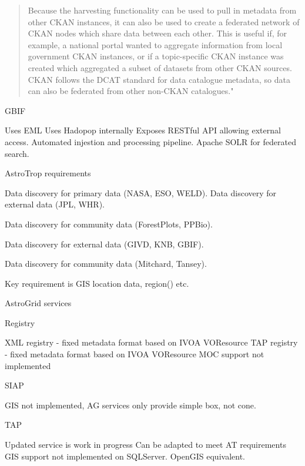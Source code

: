 \documentclass{article}
\begin{document}
\begin{quote}
Because the harvesting functionality can be used to pull in metadata from other CKAN instances,
it can also be used to create a federated network of CKAN nodes which share data between each other.
This is useful if, for example, a national portal wanted to aggregate information from local
government CKAN instances, or if a topic-specific CKAN instance was created which aggregated
a subset of datasets from other CKAN sources. CKAN follows the DCAT standard for data catalogue
metadata, so data can also be federated from other non-CKAN catalogues." 
\end{quote}



GBIF

Uses EML
Uses Hadopop internally
Exposes RESTful API allowing external access.
Automated injestion and processing pipeline.
Apache SOLR for federated search.





AstroTrop requirements

    Data discovery for primary data (NASA, ESO, WELD).
    Data discovery for external data (JPL, WHR).

    Data discovery for community data (ForestPlots, PPBio).

    Data discovery for external data (GIVD, KNB, GBIF).

    Data discovery for community data (Mitchard, Tansey).

    Key requirement is GIS location data, region() etc.

AstroGrid services

    Registry

        XML registry - fixed metadata format based on IVOA VOResource
        TAP registry - fixed metadata format based on IVOA VOResource
        MOC support not implemented

    SIAP
    
        GIS not implemented, AG services only provide simple box, not cone.

    TAP
    
        Updated service is work in progress
        Can be adapted to meet AT requirements
        GIS support not implemented on SQLServer.
        OpenGIS equivalent.










%
%

\printbibliography
\end{document}
